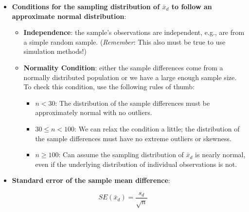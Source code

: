 \documentclass[
]{report}
\begin{document}
\begin{itemize}
\item
  \textbf{Conditions for the sampling distribution of \(\bar{x}_d\) to follow an approximate normal distribution}:

  \begin{itemize}
  \item
    \textbf{Independence}: the sample's observations are independent, e.g., are from a simple random sample. (\emph{Remember}: This also must be true to use simulation methods!)
  \item
    \textbf{Normality Condition}: either the sample differences come from a normally distributed population or we have a large enough sample size. To check this condition, use the following rules of thumb:

    \begin{itemize}
    \item
      \(n < 30\): The distribution of the sample differences must be approximately normal with no outliers.
    \item
      \(30 \le n < 100\): We can relax the condition a little; the distribution of the sample differences must have no extreme outliers or skewness.
    \item
      \(n \ge 100\): Can assume the sampling distribution of \(\bar{x}_d\) is nearly normal, even if the underlying distribution of individual observations is not.
    \end{itemize}
  \end{itemize}
\item
  \textbf{Standard error of the sample mean difference}:
\end{itemize}

\[SE(\bar{x}_d) = \frac{s_d}{\sqrt{n}}\]
\end{document}
